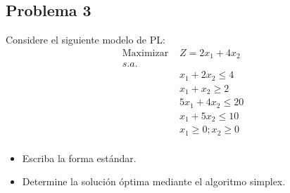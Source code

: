 \documentclass[letterpaper]{article}
\begin{document}
\subsection*{Problema 3}
Considere el siguiente modelo de PL:
\begin{align*}
\mbox{Maximizar }&Z = 2x_1 + 4x_2\\
s.a.\\
&x_1 + 2x_2 \leq 4\\
&x_1 + x_2 \geq 2\\
&5x_1 + 4x_2 \leq 20\\
&x_1 + 5x_2 \leq 10\\
&x_1 \geq 0; x_2 \geq 0 \\
\end{align*}

\begin{itemize}
\item Escriba la forma estándar. 
\item Determine la solución óptima mediante el algoritmo simplex.
\end{itemize}
\end{document}
